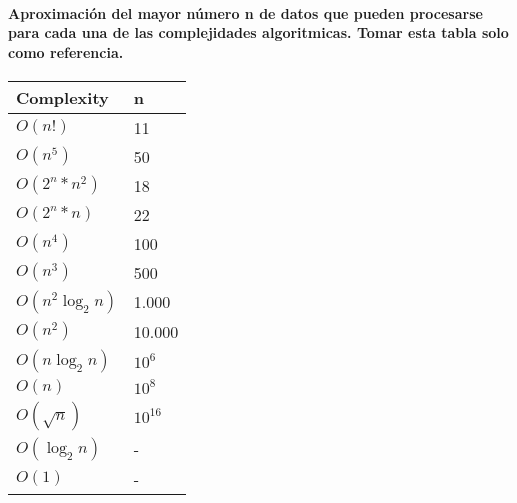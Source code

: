 
\paragraph{Aproximaci\'on del mayor n\'umero n de datos que pueden procesarse para cada una de las complejidades algoritmicas. Tomar esta tabla solo como referencia.}

\begin{table}[htb]
\begin{tabular}{|l|l|}
\hline
Complexity & n\\ \hline
$O(n!)$ & 11\\ \hline
$O(n^{5})$ & 50\\ \hline
$O(2^{n}*n^{2})$ & 18\\ \hline
$O(2^{n}*n)$ & 22\\ \hline
$O(n^{4})$ & 100\\ \hline
$O(n^{3})$ & 500\\ \hline
$O(n^{2}\log_{2}n)$ & 1.000\\ \hline
$O(n^{2})$ & 10.000\\ \hline
$O(n\log_{2}n)$ & $10^{6}$\\ \hline
$O(n)$ & $10^{8}$\\ \hline
$O(\sqrt{n})$ & $10^{16}$\\ \hline
$O(\log_{2}n)$ & -\\ \hline
$O(1)$ & -\\ \hline
\end{tabular}
\end{table}

